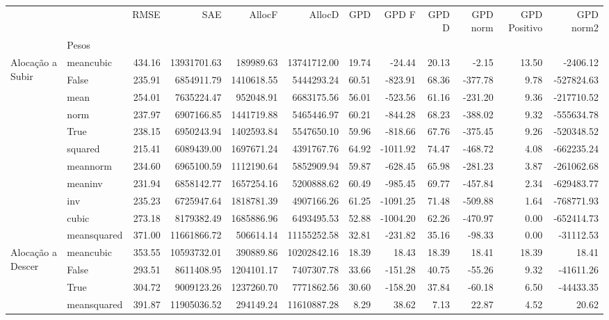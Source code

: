 \begin{tabular}{llrrrrrrrrrr}
\toprule
 &  & RMSE & SAE & AllocF & AllocD & GPD & GPD F & GPD D & GPD norm & GPD Positivo & GPD norm2 \\
 & Pesos &  &  &  &  &  &  &  &  &  &  \\
\midrule
\multirow[t]{11}{*}{Alocação a Subir} & meancubic & 434.16 & 13931701.63 & 189989.63 & 13741712.00 & 19.74 & -24.44 & 20.13 & -2.15 & 13.50 & -2406.12 \\
 & False & 235.91 & 6854911.79 & 1410618.55 & 5444293.24 & 60.51 & -823.91 & 68.36 & -377.78 & 9.78 & -527824.63 \\
 & mean & 254.01 & 7635224.47 & 952048.91 & 6683175.56 & 56.01 & -523.56 & 61.16 & -231.20 & 9.36 & -217710.52 \\
 & norm & 237.97 & 6907166.85 & 1441719.88 & 5465446.97 & 60.21 & -844.28 & 68.23 & -388.02 & 9.32 & -555634.78 \\
 & True & 238.15 & 6950243.94 & 1402593.84 & 5547650.10 & 59.96 & -818.66 & 67.76 & -375.45 & 9.26 & -520348.52 \\
 & squared & 215.41 & 6089439.00 & 1697671.24 & 4391767.76 & 64.92 & -1011.92 & 74.47 & -468.72 & 4.08 & -662235.24 \\
 & meannorm & 234.60 & 6965100.59 & 1112190.64 & 5852909.94 & 59.87 & -628.45 & 65.98 & -281.23 & 3.87 & -261062.68 \\
 & meaninv & 231.94 & 6858142.77 & 1657254.16 & 5200888.62 & 60.49 & -985.45 & 69.77 & -457.84 & 2.34 & -629483.77 \\
 & inv & 235.23 & 6725947.64 & 1818781.39 & 4907166.26 & 61.25 & -1091.25 & 71.48 & -509.88 & 1.64 & -768771.93 \\
 & cubic & 273.18 & 8179382.49 & 1685886.96 & 6493495.53 & 52.88 & -1004.20 & 62.26 & -470.97 & 0.00 & -652414.73 \\
 & meansquared & 371.00 & 11661866.72 & 506614.14 & 11155252.58 & 32.81 & -231.82 & 35.16 & -98.33 & 0.00 & -31112.53 \\
\cline{1-12}
\multirow[t]{12}{*}{Alocação a Descer} & meancubic & 353.55 & 10593732.01 & 390889.86 & 10202842.16 & 18.39 & 18.43 & 18.39 & 18.41 & 18.39 & 18.41 \\
 & False & 293.51 & 8611408.95 & 1204101.17 & 7407307.78 & 33.66 & -151.28 & 40.75 & -55.26 & 9.32 & -41611.26 \\
 & True & 304.72 & 9009123.26 & 1237260.70 & 7771862.56 & 30.60 & -158.20 & 37.84 & -60.18 & 6.50 & -44433.35 \\
 & meansquared & 391.87 & 11905036.52 & 294149.24 & 11610887.28 & 8.29 & 38.62 & 7.13 & 22.87 & 4.52 & 20.62 \\

\end{tabular}
